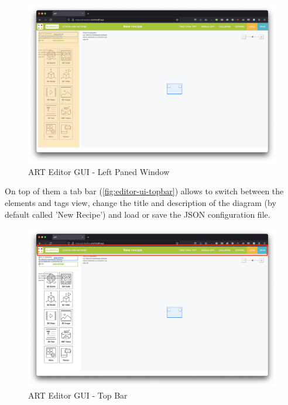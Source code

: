 \begin{figure}[h]
    \centering
    \includegraphics[width=\textwidth]{Figures/Editor/editor-ui-tab.png}
    \caption{ART Editor GUI - Left Paned Window}
    \label{fig:editor-ui-tab}
\end{figure}
On top of them a tab bar (\autoref{fig:editor-ui-topbar}) allows to switch between the elements and tags view, change the title and description of the diagram (by default called 'New Recipe') and load or save the \gls{JSON} configuration file.
\begin{figure}[H]
    \includegraphics[width=\textwidth]{Figures/Editor/editor-ui-topbar.png}
    \caption{ART Editor GUI - Top Bar}
    \label{fig:editor-ui-topbar}
\end{figure}

